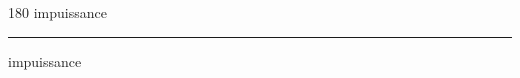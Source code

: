 
\begin{frame}
\begin{center}
\begin{turn}{180}
{\fontsize{2.5cm}{1em}\selectfont impuissance}
\end{turn}
\vspace{1em}\par  
\hrule
\vspace{1em}\par  
{\fontsize{2.5cm}{1em}\selectfont impuissance}
\end{center}
\end{frame}
